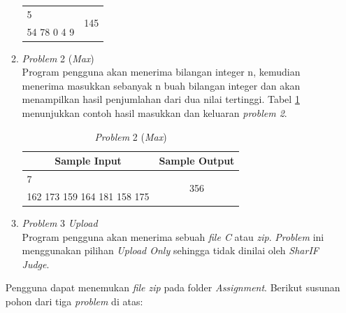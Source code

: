 \documentclass[a4paper,twoside]{article}
\begin{document}
\begin{enumerate}
\begin{enumerate}
\begin{table}[H]
\begin{tabular}{|c|c|}
					\hline
					\multicolumn{1}{|l|}{5} & \multirow{2}{*}{145}\\
					\multicolumn{1}{|l|}{54 78 0 4 9} & \\
					
					\hline
					
				\end{tabular} 
			\end{table}
			
			\item \textit{Problem} 2 (\textit{Max}) \\
			Program pengguna akan menerima bilangan integer n, kemudian menerima masukkan sebanyak n buah bilangan integer dan akan menampilkan hasil penjumlahan dari dua nilai tertinggi. Tabel \ref{tab:problem_max} menunjukkan contoh hasil masukkan dan keluaran \textit{problem 2}.
			
			\begin{table}[H]
				\centering 
				\caption{\textit{Problem} 2 (\textit{Max})}
				\label{tab:problem_max}
				\begin{tabular}{|c|c|}
					\hline
					Sample Input & Sample Output\\
					
					\hline
					\multicolumn{1}{|l|}{7} & \multirow{2}{*}{356}\\
					\multicolumn{1}{|l|}{162 173 159 164 181 158 175} & \\
					
					\hline
					
				\end{tabular} 
			\end{table}
			
			\item \textit{Problem} 3 \textit{Upload} \\
			Program pengguna akan menerima sebuah \textit{file C} atau \textit{zip}. \textit{Problem} ini menggunakan pilihan \textit{Upload Only} sehingga tidak dinilai oleh \textit{SharIF Judge}.
		\end{enumerate}
		
		Pengguna dapat menemukan \textit{file zip} pada folder \textit{Assignment}. Berikut susunan pohon dari tiga \textit{problem} di atas:
		

\end{enumerate}
\end{document}
